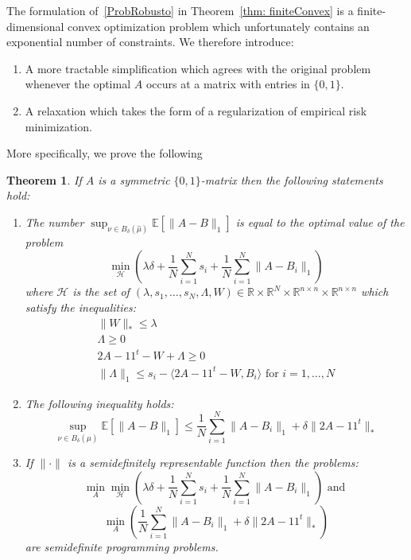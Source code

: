 \documentclass[12pt]{amsart}
\newtheorem{theorem}[lemma]{Theorem}
\theoremstyle{remark}
\newcommand{\EE}{\mathbb{E}}
\newcommand{\RR}{\mathbb{R}}
\begin{document}
The formulation of~\ref{ProbRobusto} in Theorem~\ref{thm: finiteConvex} is a finite-dimensional convex optimization problem which unfortunately contains  an exponential number of constraints. We therefore introduce:
\begin{enumerate}
\item A more tractable simplification which agrees with the original problem whenever the optimal $A$ occurs at a matrix with entries in $\{0,1\}$.
\item A relaxation which takes the form of a regularization of empirical risk minimization.
\end{enumerate}
More specifically, we prove the following 

\begin{theorem}\label{Thm: tractable}If $A$ is a symmetric $\{0,1\}$-matrix then the following statements hold:
\begin{enumerate}
\item{  The number $\sup_{\nu\in B_{\delta}(\hat{\mu})} \EE[\|A-B\|_1]$ is equal to the optimal value of the problem
\[
\min_{\mathcal{H}} \left(\lambda\delta +\frac{1}{N}\sum_{i=1}^N s_i+\frac{1}{N}\sum_{i=1}^N\|A-B_i\|_1\right)
\]
where $\mathcal{H}$ is the set of $(\lambda, s_1,\dots, s_N,\Lambda, W)\in \RR\times\RR^N\times \RR^{n\times n} \times \RR^{n\times n}$ which satisfy the inequalities:
\[
\begin{array}{l}
\|W\|_{*}\leq \lambda\\
\Lambda \geq 0\\
2A-11^t-W + \Lambda \geq 0\\
\|\Lambda\|_{1}\leq s_i-\langle 2A-11^t-W, B_i\rangle\text{ for $i=1,\dots, N$}
\end{array}
\]}
\item The following inequality holds:
\[\sup_{\nu\in B_{\delta}(\hat{\mu})} \EE[\|A-B\|_1]\leq \frac{1}{N}\sum_{i=1}^N\|A-B_i\|_1+ \delta\|2A-11^t\|_*\]
\item If $\|\cdot\|$ is a semidefinitely representable function then the problems:
\begin{equation}\label{eqn: WRGS}
\min_A \min_{\mathcal{H}} \left(\lambda\delta +\frac{1}{N}\sum_{i=1}^N s_i+\frac{1}{N}\sum_{i=1}^N\|A-B_i\|_1\right)\text{ and }
\end{equation}
\begin{equation}\label{eqn: WRGS2}
\min_A\left(\frac{1}{N}\sum_{i=1}^N\|A-B_i\|_1+ \delta\|2A-11^t\|_*\right)
\end{equation}
are semidefinite programming problems.
\end{enumerate}
\end{theorem}
\end{document}
